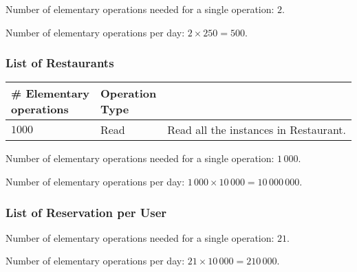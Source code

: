 Number of elementary operations needed for a single operation: \(2\).

Number of elementary operations per day: \(2 \times 250 = 500\).

\subsubsection{List of Restaurants}

\begin{tabular}{|l|l|l|}
	\hline
	\thead{\# Elementary\\operations} & \thead{Operation\\Type} & \thead{Justification} \\
	\hline
	\(1000\) & Read & Read all the instances in Restaurant.\\
	\hline
\end{tabular}

Number of elementary operations needed for a single operation: \(1\,000\).

Number of elementary operations per day: \(1\,000 \times 10\,000 = 10\,000\,000\).

\subsubsection{List of Reservation per User}


Number of elementary operations needed for a single operation: \(21\).

Number of elementary operations per day: \(21 \times 10\,000 = 210\,000\).

